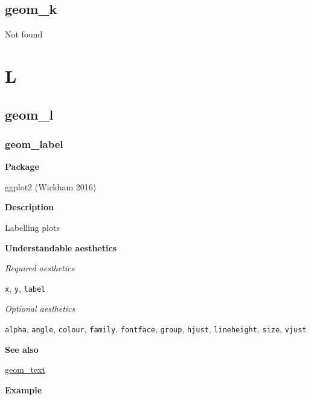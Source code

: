 \documentclass[
  letterpaper,
  DIV=11,
  numbers=noendperiod]{scrreprt}
\begin{document}
\chapter{geom\_k}\label{sec-k}

Not found

\part{L}

\chapter{geom\_l}\label{sec-l}

\section{geom\_label}\label{geom_label}

\textbf{Package}

ggplot2 (Wickham 2016)

\textbf{Description}

Labelling plots

\textbf{Understandable aesthetics}

\emph{Required aesthetics}

\texttt{x}, \texttt{y}, \texttt{label}

\emph{Optional aesthetics}

\texttt{alpha}, \texttt{angle}, \texttt{colour}, \texttt{family},
\texttt{fontface}, \texttt{group}, \texttt{hjust}, \texttt{lineheight},
\texttt{size}, \texttt{vjust}

\textbf{See also}

\hyperref[text]{geom\_text}

\textbf{Example}
\end{document}
